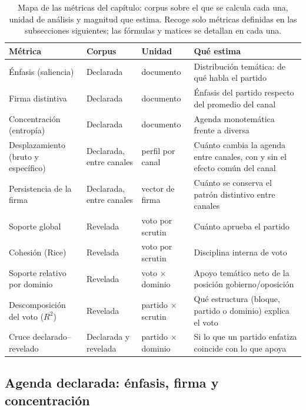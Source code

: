 \begin{table}[H]
\centering
\caption{Mapa de las métricas del capítulo: corpus sobre el que se calcula cada
una, unidad de análisis y magnitud que estima. Recoge solo métricas definidas en
las subsecciones siguientes; las fórmulas y matices se detallan en cada una.}
\label{tab:metricas-mapa}
\footnotesize
\setlength{\tabcolsep}{4pt}
\renewcommand{\arraystretch}{1.2}
\begin{tabularx}{\textwidth}{@{}l l l Y@{}}
\toprule
\textbf{Métrica} & \textbf{Corpus} & \textbf{Unidad} & \textbf{Qué estima} \\
\midrule
Énfasis (saliencia) & Declarada & documento & Distribución temática: de qué habla el partido \\
Firma distintiva & Declarada & documento & Énfasis del partido respecto del promedio del canal \\
Concentración (entropía) & Declarada & documento & Agenda monotemática frente a diversa \\
Desplazamiento (bruto y específico) & Declarada, entre canales & perfil por canal & Cuánto cambia la agenda entre canales, con y sin el efecto común del canal \\
Persistencia de la firma & Declarada, entre canales & vector de firma & Cuánto se conserva el patrón distintivo entre canales \\
Soporte global & Revelada & voto por scrutin & Cuánto aprueba el partido \\
Cohesión (Rice) & Revelada & voto por scrutin & Disciplina interna de voto \\
Soporte relativo por dominio & Revelada & voto $\times$ dominio & Apoyo temático neto de la posición gobierno/oposición \\
Descomposición del voto ($R^2$) & Revelada & partido $\times$ scrutin & Qué estructura (bloque, partido o dominio) explica el voto \\
Cruce declarado--revelado & Declarada y revelada & partido $\times$ dominio & Si lo que un partido enfatiza coincide con lo que apoya \\
\bottomrule
\end{tabularx}
\end{table}

\subsection{Agenda declarada: énfasis, firma y concentración}
\label{sec:metricas-declarada}

